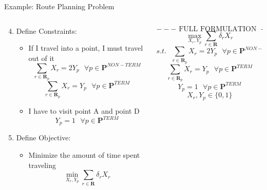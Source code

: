 \documentclass[10pt, aspectratio=169]{beamer}
\begin{document}
\begin{frame}[t]{Example: Route Planning Problem}
    \vspace{-0.2cm}
    \begin{columns}[t]
        \begin{column}[t]{0.5\textwidth}
            \begin{enumerate}
                \setcounter{enumi}{3}
                \item Define Constraints:
                \begin{itemize}
                    \item If I travel into a point, I must travel out of it 
                    $$\sum_{r \in \textbf{R}_p} X_r = 2 Y_p \ \ \ \forall p \in \textbf{P}^{NON-TERM}$$
                    $$\sum_{r \in \textbf{R}_p} X_r = Y_p \ \ \ \forall p \in \textbf{P}^{TERM}$$

                    \item I have to visit point A and point D
                    $$Y_p = 1 \ \ \ \forall p \in \textbf{P}^{TERM}$$
                \end{itemize}
                \item Define Objective:
                \begin{itemize}
                    \item Minimize the amount of time spent traveling
                    $$\min_{X_r,Y_p} \sum_{r \in \textbf{R}} \delta_r X_r$$
                \end{itemize}
            \end{enumerate}
        \end{column}
        \begin{column}[t]{0.5\textwidth}
            $$---\text{ FULL FORMULATION }---$$
            $$\max_{X_r,Y_p} \sum_{r \in \textbf{R}} \delta_r X_r$$
            $$s.t.\ \ \ \sum_{r \in \textbf{R}_p} X_r = 2 Y_p \ \ \ \forall p \in \textbf{P}^{NON-TERM}$$
            $$\sum_{r \in \textbf{R}_p} X_r = Y_p \ \ \ \forall p \in \textbf{P}^{TERM}$$
            $$Y_p = 1 \ \ \ \forall p \in \textbf{P}^{TERM}$$
            $$X_r, Y_p \in \{0,1\}$$

        \end{column}
    \end{columns}
\end{frame}
\end{document}
